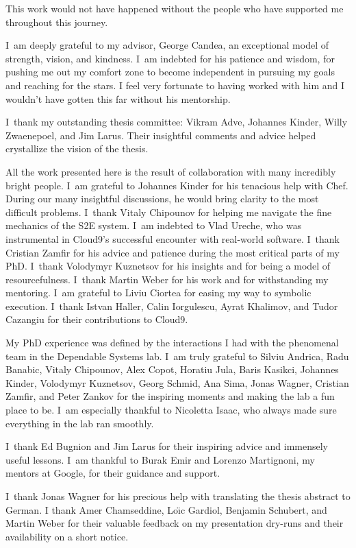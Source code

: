 This work would not have happened without the people who have supported me throughout this journey.


I~am deeply grateful to my advisor, George Candea, an exceptional model of strength, vision, and kindness.
%
I~am indebted for his patience and wisdom, for pushing me out my comfort zone to become independent in pursuing my goals and reaching for the stars.  I feel very fortunate to having worked with him and I wouldn't have gotten this far without his mentorship.


I~thank my outstanding thesis committee: Vikram Adve, Johannes Kinder, Willy Zwaenepoel, and Jim Larus.  Their insightful comments and advice helped crystallize the vision of the thesis.


All the work presented here is the result of collaboration with many incredibly bright people.
%
I~am grateful to Johannes Kinder for his tenacious help with Chef.  During our many insightful discussions, he would bring clarity to the most difficult problems.
%
I~thank Vitaly Chipounov for helping me navigate the fine mechanics of the S2E system.
%
I~am indebted to Vlad Ureche, who was instrumental in Cloud9's successful encounter with real-world software.
%
I~thank Cristian Zamfir for his advice and patience during the most critical parts of my PhD.
%
I~thank Volodymyr Kuznetsov for his insights and for being a model of resourcefulness.
%
I~thank Martin Weber for his work and for withstanding my mentoring. 
%
I~am grateful to Liviu Ciortea for easing my way to symbolic execution.
%
I~thank Istvan Haller, Calin Iorgulescu, Ayrat Khalimov, and Tudor Cazangiu for their contributions to Cloud9.


My PhD experience was defined by the interactions I had with the phenomenal team in the Dependable Systems lab.
%
I~am truly grateful to
Silviu Andrica,
Radu Banabic,
Vitaly Chipounov,
Alex Copot,
Horatiu Jula,
Baris Kasikci,
Johannes Kinder,
Volodymyr Kuznetsov,
Georg Schmid,
Ana Sima,
Jonas Wagner,
Cristian Zamfir,
and
Peter Zankov
for the inspiring moments and making the lab a fun place to be.
%
I~am especially thankful to Nicoletta Isaac, who always made sure everything in the lab ran smoothly.


I~thank Ed Bugnion and Jim Larus for their inspiring advice and immensely useful lessons.
%
I~am thankful to Burak Emir and Lorenzo Martignoni, my mentors at Google, for their guidance and support.


I~thank Jonas Wagner for his precious help with translating the thesis abstract to German.
%
I thank Amer Chamseddine, Lo\"{\i}c Gardiol, Benjamin Schubert, and Martin Weber for their valuable feedback on my presentation dry-runs and their availability on a short notice.


